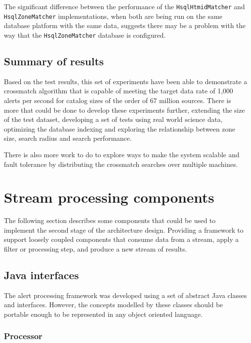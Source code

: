 \documentclass{article}
\newcommand{\crossmatch} {crossmatch\xspace}
\newcommand{\dataset} {dataset\xspace}
\newcommand{\catalog} {catalog\xspace}
\begin{document}
The significant difference between the performance of the \texttt{HsqlHtmidMatcher} and \texttt{HsqlZoneMatcher} implementations, when both are being run on the same database platform with the same data, suggests there may be a problem with the way that the \texttt{HsqlZoneMatcher} database is configured.

\subsection{Summary of results}
\label{crossmatch-summary}

Based on the test results, this set of experiments have been able to demonstrate a \crossmatch algorithm that is capable of meeting the target data rate of 1,000 alerts per second for \catalog sizes of the order of 67 million sources. 
There is more that could be done to develop these experiments further, extending the size of the test \dataset, developing a set of tests using real world science data, optimizing the database indexing and exploring the relationship between zone size, search radius and search performance.

There is also more work to do to explore ways to make the system scalable and fault tolerance by distributing the \crossmatch searches over multiple machines.

\section{Stream processing components}
\label{stream-processing-components}

The following section describes some components that could be used to implement the second stage of the architecture design. Providing a framework to support loosely coupled components that consume data from a stream, apply a filter or processing step, and produce a new stream of results.

\subsection{Java interfaces}
\label{component-libraries.java-interfaces}

The alert processing framework was developed using a set of abstract Java classes and interfaces. However, the concepts modelled by these classes should be portable enough to be represented in any object oriented language.

\subsubsection{Processor}
\label{java-interfaces.Processor}
\end{document}
